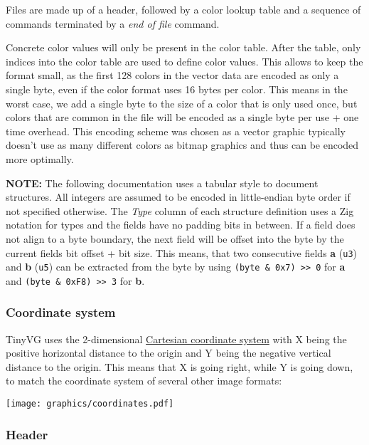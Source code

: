 \documentclass[]{article}
\begin{document}
Files are made up of a header, followed by a color lookup table and a
sequence of commands terminated by a \emph{end of file} command.

Concrete color values will only be present in the color table. After the
table, only indices into the color table are used to define color
values. This allows to keep the format small, as the first 128 colors in
the vector data are encoded as only a single byte, even if the color
format uses 16 bytes per color. This means in the worst case, we add a
single byte to the size of a color that is only used once, but colors
that are common in the file will be encoded as a single byte per use +
one time overhead. This encoding scheme was chosen as a vector graphic
typically doesn't use as many different colors as bitmap graphics and
thus can be encoded more optimally.

\textbf{NOTE:} The following documentation uses a tabular style to
document structures. All integers are assumed to be encoded in
little-endian byte order if not specified otherwise. The \emph{Type}
column of each structure definition uses a Zig notation for types and
the fields have no padding bits in between. If a field does not align to
a byte boundary, the next field will be offset into the byte by the
current fields bit offset + bit size. This means, that two consecutive
fields \textbf{a} (\texttt{u3}) and \textbf{b} (\texttt{u5}) can be
extracted from the byte by using
\texttt{(byte\ \&\ 0x7)\ \textgreater{}\textgreater{}\ 0} for \textbf{a}
and \texttt{(byte\ \&\ 0xF8)\ \textgreater{}\textgreater{}\ 3} for
\textbf{b}.

\hypertarget{coordinate-system}{%
\subsubsection{Coordinate system}\label{coordinate-system}}

TinyVG uses the 2-dimensional
\href{https://en.wikipedia.org/wiki/Cartesian_coordinate_system}{Cartesian
coordinate system} with X being the positive horizontal distance to the
origin and Y being the negative vertical distance to the origin. This
means that X is going right, while Y is going down, to match the
coordinate system of several other image formats:

\texttt{[image: graphics/coordinates.pdf]}

\hypertarget{header}{%
\subsubsection{Header}\label{header}}
\end{document}
